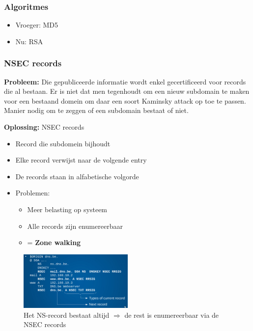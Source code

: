 \documentclass{article}
\newcommand{\bold}[1]{\textbf{#1}}
\begin{document}
\subsubsection{Algoritmes}

\begin{itemize}
    \item Vroeger: MD5
    \item Nu: RSA
\end{itemize}

\subsubsection{NSEC records}

\bold{Probleem:} Die gepubliceerde informatie wordt enkel gecertificeerd voor records die al bestaan. 
Er is niet dat men tegenhoudt om een nieuw subdomain te maken voor een bestaand domein om daar een soort Kaminsky attack op toe te passen.
Manier nodig om te zeggen of een subdomain bestaat of niet.

\bold{Oplossing:} NSEC records

\begin{itemize}
    \item Record die subdomein bijhoudt
    \item Elke record verwijst naar de volgende entry
    \item De records staan in alfabetische volgorde
    \item Problemen:
    \begin{itemize}
        \item Meer belasting op systeem
        \item Alle records zijn enumereerbaar
        \item = \bold{Zone walking}
    \end{itemize}
\end{itemize}

\begin{figure}[H]
    \centering
    \includegraphics[width=0.5\textwidth]{nsec.png}
    \caption{Het NS-record bestaat altijd $\Rightarrow$ de rest is enumereerbaar via de NSEC records}
\end{figure}
\end{document}
